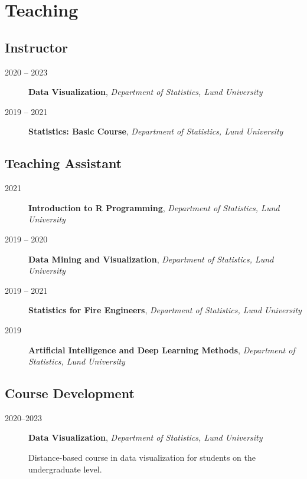 \documentclass[english,a4paper]{article}
\renewcommand*{%
  \mkbibnamegiven
}[1]{\ifitemannotation{highlight}{\textbf{#1}}{#1}}
\renewcommand*{%
  \mkbibnamefamily
}[1]{\ifitemannotation{highlight}{\textbf{#1}}{#1}}
\begin{document}
\section{Teaching}

\subsection{Instructor}

\begin{description}
  \item[2020 -- 2023]{\textbf{Data Visualization}, \emph{Department of Statistics, Lund University}}
  \item[2019 -- 2021]{\textbf{Statistics: Basic Course}, \emph{Department of Statistics, Lund University}}
\end{description}

\subsection{Teaching Assistant}

\begin{description}
  \item[2021]{\textbf{Introduction to R Programming}, \emph{Department of Statistics, Lund University}}
  \item[2019 -- 2020]{\textbf{Data Mining and Visualization}, \emph{Department of Statistics, Lund University}}
  \item[2019 -- 2021]{\textbf{Statistics for Fire Engineers}, \emph{Department of Statistics, Lund University}}
  \item[2019]{\textbf{Artificial Intelligence and Deep Learning Methods}, \emph{Department of Statistics, Lund University}}
\end{description}

\subsection{Course Development}

\begin{description}
  \item[2020--2023]{
              \textbf{Data Visualization}, \emph{Department of Statistics, Lund
                University}

              Distance-based course in data visualization for students on
              the undergraduate level.
        }
\end{description}
\end{document}
